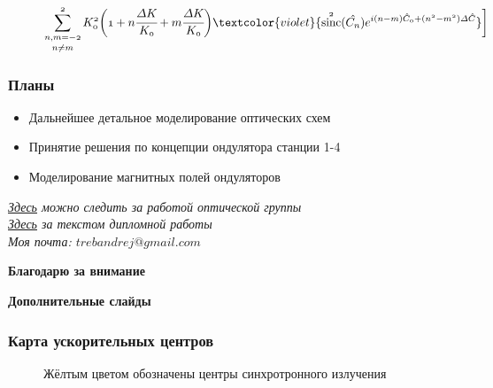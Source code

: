 \documentclass[14pt, hyperref = {colorlinks}]{beamer}
\DeclareMathOperator{\sinc}{sinc}
\begin{document}
\begin{frame}
\begin{figure}[h]
	$\mathnormal{\displaystyle\mathop{\sum\limits_{n, m =-2}^{2}}_{n \neq m}K^2_0\bigg(1 + n\cfrac{\Delta K}{K_0} + m\cfrac{\Delta K}{K_0}\bigg)
	\textcolor{violet}{\sinc^2(\hat{C_n})e^{i(n-m)\hat{C}_0 + (n^2 - m^2)\Delta \hat{C}}}\bigg]}$
\end{figure}
\end{frame}

\small
\begin{frame}
\frametitle{Планы}\label{t1}
\begin{center}
	\begin{itemize}
		\item Дальнейшее детальное моделирование оптических схем
		\item Принятие решения по концепции ондулятора станции 1-4
		\item Моделирование магнитных полей ондуляторов	
	\end{itemize}
\end{center}
{\textit{\href{https://github.com/TrebAndrew/thesis_andrei.git}{Здесь} можно следить за работой оптической группы}}\\
{\textit{\href{https://github.com/TrebAndrew/diploma.git}{Здесь} за текстом дипломной работы}}\\
{\textit{Моя почта: $trebandrej@gmail.com$}}\\
\end{frame}

\begin{frame}
\begin{center}
	\textbf{Благодарю за внимание}
\end{center}
\end{frame}


\begin{frame}
\begin{center}
	\textbf{Дополнительные слайды}
\end{center}
\end{frame}

\small
\begin{frame}\label{r3}
\frametitle{Карта ускорительных центров}
\vspace{-20pt}
\begin{figure}[h]
	\raggedright\tiny{Жёлтым цветом обозначены центры синхротронного излучения}
\end{figure}
\end{frame}
\end{document}
